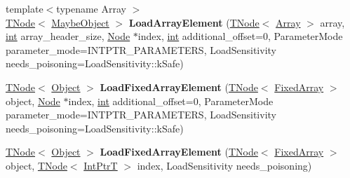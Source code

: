 \begin{DoxyCompactItemize}
\item 
\mbox{\label{classv8_1_1internal_1_1CodeStubAssembler_a89fe7c71960d33fded794dd8d7117f41}} 
{\footnotesize template$<$typename Array $>$ }\\\mbox{\hyperlink{classv8_1_1internal_1_1compiler_1_1TNode}{T\+Node}}$<$ \mbox{\hyperlink{classv8_1_1internal_1_1MaybeObject}{Maybe\+Object}} $>$ {\bfseries Load\+Array\+Element} (\mbox{\hyperlink{classv8_1_1internal_1_1compiler_1_1TNode}{T\+Node}}$<$ \mbox{\hyperlink{classv8_1_1Array}{Array}} $>$ array, \mbox{\hyperlink{classint}{int}} array\+\_\+header\+\_\+size, \mbox{\hyperlink{classv8_1_1internal_1_1compiler_1_1Node}{Node}} $\ast$index, \mbox{\hyperlink{classint}{int}} additional\+\_\+offset=0, Parameter\+Mode parameter\+\_\+mode=I\+N\+T\+P\+T\+R\+\_\+\+P\+A\+R\+A\+M\+E\+T\+E\+RS, Load\+Sensitivity needs\+\_\+poisoning=Load\+Sensitivity\+::k\+Safe)
\item 
\mbox{\label{classv8_1_1internal_1_1CodeStubAssembler_afe1ad4e1bd403ec737c5e9253f237d1f}} 
\mbox{\hyperlink{classv8_1_1internal_1_1compiler_1_1TNode}{T\+Node}}$<$ \mbox{\hyperlink{classv8_1_1internal_1_1Object}{Object}} $>$ {\bfseries Load\+Fixed\+Array\+Element} (\mbox{\hyperlink{classv8_1_1internal_1_1compiler_1_1TNode}{T\+Node}}$<$ \mbox{\hyperlink{classv8_1_1internal_1_1FixedArray}{Fixed\+Array}} $>$ object, \mbox{\hyperlink{classv8_1_1internal_1_1compiler_1_1Node}{Node}} $\ast$index, \mbox{\hyperlink{classint}{int}} additional\+\_\+offset=0, Parameter\+Mode parameter\+\_\+mode=I\+N\+T\+P\+T\+R\+\_\+\+P\+A\+R\+A\+M\+E\+T\+E\+RS, Load\+Sensitivity needs\+\_\+poisoning=Load\+Sensitivity\+::k\+Safe)
\item 
\mbox{\label{classv8_1_1internal_1_1CodeStubAssembler_a052858c2f8b27d5f09ab8761fca21c53}} 
\mbox{\hyperlink{classv8_1_1internal_1_1compiler_1_1TNode}{T\+Node}}$<$ \mbox{\hyperlink{classv8_1_1internal_1_1Object}{Object}} $>$ {\bfseries Load\+Fixed\+Array\+Element} (\mbox{\hyperlink{classv8_1_1internal_1_1compiler_1_1TNode}{T\+Node}}$<$ \mbox{\hyperlink{classv8_1_1internal_1_1FixedArray}{Fixed\+Array}} $>$ object, \mbox{\hyperlink{classv8_1_1internal_1_1compiler_1_1TNode}{T\+Node}}$<$ \mbox{\hyperlink{structv8_1_1internal_1_1IntPtrT}{Int\+PtrT}} $>$ index, Load\+Sensitivity needs\+\_\+poisoning)
\item 

\end{DoxyCompactItemize}
